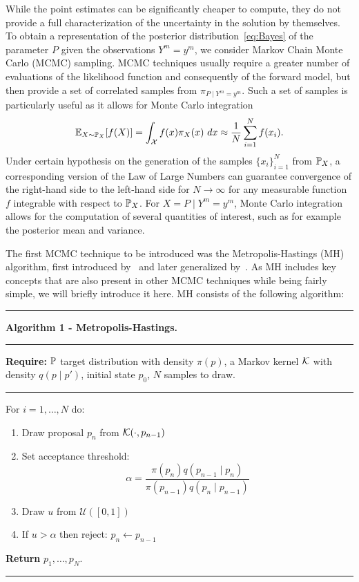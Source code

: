 While the point estimates can be significantly cheaper to compute, they do not provide a full characterization of the uncertainty in the solution by themselves.
To obtain a representation of the posterior distribution~\eqref{eq:Bayes} of the parameter $P$ given the observations $Y^m=y^m$, we consider Markov Chain Monte Carlo (MCMC) sampling.
MCMC techniques usually require a greater number of evaluations of the likelihood function and consequently of the forward model, but then provide a set of correlated samples from $\pi_{P\mid Y^m = y^m}$. 
Such a set of samples is particularly useful as it allows for Monte Carlo integration
\begin{equation}\label{eq:MC-integration}
    \mathbb E _{X \sim \mathbb P_X} [f(X)] = \int_\mathcal X f(x) \pi_X(x) \ dx \approx \frac{1}{N} \sum_{i=1}^{N} f(x_i).
\end{equation}
Under certain hypothesis on the generation of the samples $\{x_i\}_{i=1}^N$ from $\mathbb P_X$, a corresponding version of the Law of Large Numbers can guarantee convergence of the right-hand side to the left-hand side for $N \rightarrow \infty$ for any measurable function $f$ integrable with respect to $\mathbb P_X$.
For $X = P \mid Y^m = y^m$, Monte Carlo integration allows for the computation of several quantities of interest, such as for example the posterior mean and variance.

The first MCMC technique to be introduced was the Metropolis-Hastings (MH) algorithm, first introduced by~\cite{MetropolisRosenbluthRosenbluthTellerTeller1953} and later generalized by~\cite{Hastings1970}.
As MH includes key concepts that are also present in other MCMC techniques while being fairly simple, we will briefly introduce it here.
MH consists of the following algorithm:

\par\noindent\rule[1mm]{\textwidth}{0.4pt}
 \makeatletter{}\makeatother\label{algo:MH}
\large{\textbf{Algorithm 1 - Metropolis-Hastings.} } \normalsize
\par\noindent\rule[2mm]{\textwidth}{0.2pt}
\textbf{Require:} $\mathbb P$ target distribution with density $\pi(p)$, a Markov kernel $\mathcal K$ with density $q(p \mid p ' )$, initial state $p_0$, $N$ samples to draw.
\par\noindent\rule[2mm]{\textwidth}{0.2pt}
For $i =1, \dots, N$ do: 
\begin{enumerate}
    \item Draw proposal $p_n$ from $\mathcal K (\cdot, p_{n-1})$
    \item Set acceptance threshold: \[ \alpha = \frac{\pi(p_n) q(p_{n-1} \mid p_n )}{\pi(p_{n-1}) q(p_n \mid p_{n-1} )} \]
    \item Draw $u$ from $\mathcal{U}([0,1])$
    \item If $u > \alpha$ then reject: $p_n \leftarrow p_{n-1}$
\end{enumerate}
\textbf{Return} $p_1, \dots, p_N$.
\par\noindent\rule[3.5mm]{\textwidth}{0.4pt}

